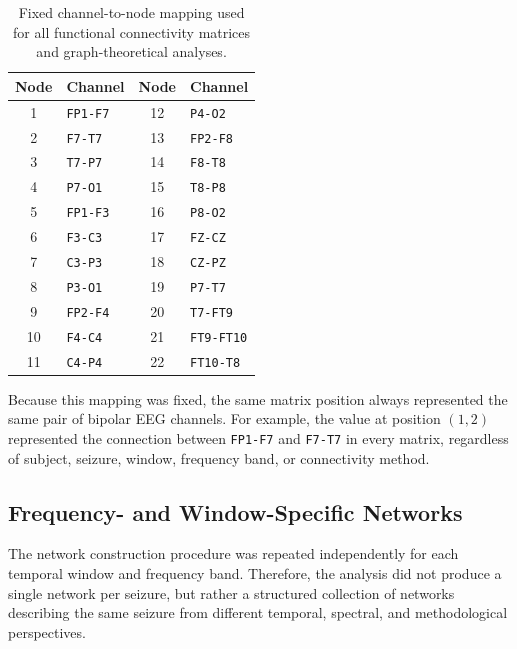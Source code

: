 \begin{table}[H]
    \centering
    \begin{tabular}{clcl}
        \toprule
        Node & Channel & Node & Channel \\
        \midrule
        1  & \texttt{FP1-F7}   & 12 & \texttt{P4-O2} \\
        2  & \texttt{F7-T7}    & 13 & \texttt{FP2-F8} \\
        3  & \texttt{T7-P7}    & 14 & \texttt{F8-T8} \\
        4  & \texttt{P7-O1}    & 15 & \texttt{T8-P8} \\
        5  & \texttt{FP1-F3}   & 16 & \texttt{P8-O2} \\
        6  & \texttt{F3-C3}    & 17 & \texttt{FZ-CZ} \\
        7  & \texttt{C3-P3}    & 18 & \texttt{CZ-PZ} \\
        8  & \texttt{P3-O1}    & 19 & \texttt{P7-T7} \\
        9  & \texttt{FP2-F4}   & 20 & \texttt{T7-FT9} \\
        10 & \texttt{F4-C4}    & 21 & \texttt{FT9-FT10} \\
        11 & \texttt{C4-P4}    & 22 & \texttt{FT10-T8} \\
        \bottomrule
    \end{tabular}
    \caption{Fixed channel-to-node mapping used for all functional connectivity
    matrices and graph-theoretical analyses.}
    \label{tab:channel-node-mapping}
\end{table}

Because this mapping was fixed, the same matrix position always represented the
same pair of bipolar EEG channels. For example, the value at position
$(1,2)$ represented the connection between \texttt{FP1-F7} and \texttt{F7-T7}
in every matrix, regardless of subject, seizure, window, frequency band, or
connectivity method.

\subsection{Frequency- and Window-Specific Networks}
\label{subsec:frequency-window-specific-networks}

The network construction procedure was repeated independently for each temporal
window and frequency band. Therefore, the analysis did not produce a single
network per seizure, but rather a structured collection of networks describing
the same seizure from different temporal, spectral, and methodological
perspectives.

